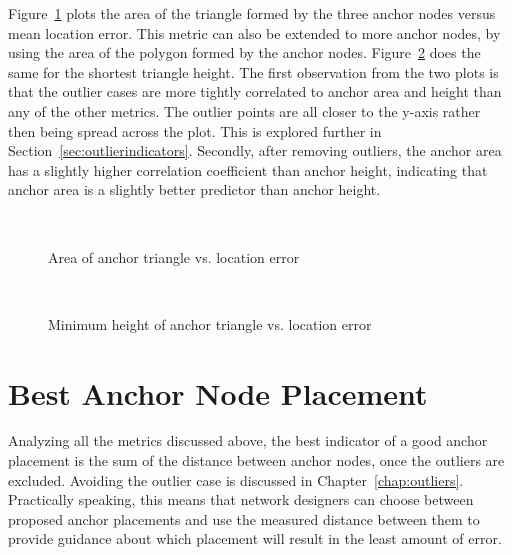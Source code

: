 Figure~\ref{fig:AnchorArea} plots the area of the triangle formed by the three anchor nodes versus mean location error.  This metric can also be extended to more anchor nodes, by using the area of the polygon formed by the anchor nodes.  Figure~\ref{fig:AnchorHeight} does the same for the shortest triangle height. The first observation from the two plots is that the outlier cases are more tightly correlated to anchor area and height than any of the other metrics. The outlier points are all closer to the y-axis rather then being spread across the plot. This is explored further in Section~\ref{sec:outlierindicators}.  Secondly, after removing outliers, the anchor area has a slightly higher correlation coefficient than anchor height, indicating that anchor area is a slightly better predictor than anchor height.

\begin{figure}
  \centering
\\
	\caption{Area of anchor triangle vs. location error}	
	\label{fig:AnchorArea}
\end{figure}

\begin{figure}
  \centering
		\\
	\caption{Minimum height of anchor triangle vs. location error}	
	\label{fig:AnchorHeight}
\end{figure}

\section{Best Anchor Node Placement}
\label{sec:bestanchornode}
Analyzing all the metrics discussed above, the best indicator of a good anchor placement is the sum of the distance between anchor nodes, once the outliers are excluded.  Avoiding the outlier case is discussed in Chapter~\ref{chap:outliers}.  Practically speaking, this means that network designers can choose between proposed anchor placements and use the measured distance between them to provide guidance about which placement will result in the least amount of error. 

